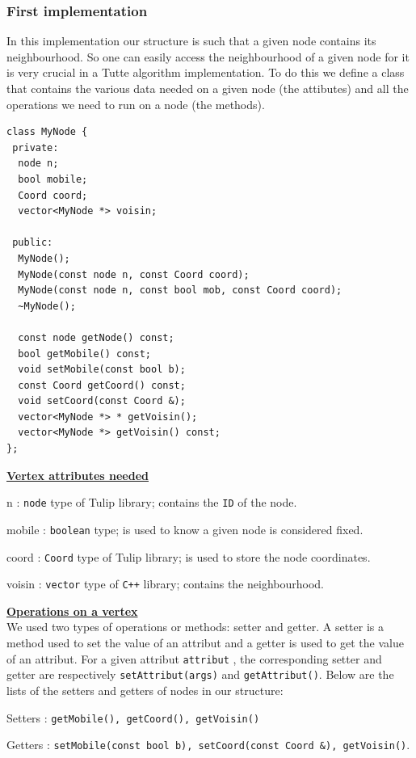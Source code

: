 \subsubsection{First implementation}
In this implementation our structure is such that a given node
contains its neighbourhood. So one can easily access the neighbourhood
of a given node for it is very crucial in a Tutte algorithm
implementation. To do this we define a class that contains the various
data needed on a given node (the attibutes) and all the operations we
need to run on a node (the methods).

\newpage
\begin{lstlisting}
class MyNode {
 private:
  node n;
  bool mobile;
  Coord coord;  
  vector<MyNode *> voisin;

 public:
  MyNode();
  MyNode(const node n, const Coord coord);
  MyNode(const node n, const bool mob, const Coord coord);
  ~MyNode();
  
  const node getNode() const;
  bool getMobile() const;
  void setMobile(const bool b);
  const Coord getCoord() const;
  void setCoord(const Coord &);
  vector<MyNode *> * getVoisin();
  vector<MyNode *> getVoisin() const;
};
\end{lstlisting}
\noindent
\underline{\bf Vertex attributes needed}
\begin{dinglist}{70}
\item[n]: \texttt{node} type of \textsf{Tulip} library; contains the \texttt{ID} of the node.  
\item[mobile]: \texttt{boolean} type; is used to know a given node is considered fixed.
\item[coord]: \texttt{Coord} type of \textsf{Tulip} library; is used to store the node coordinates. 
\item[voisin]: \texttt{vector} type of \texttt{C++} library; contains the neighbourhood.
\end{dinglist}
\noindent
\underline{\bf Operations on a vertex}~\\
We used two types of operations or methods: \textsf{setter} and
\textsf{getter}. A \textsf{setter} is a method used to set the value of an
attribut and a \textsf{getter} is used to get the value of an attribut. For
a given attribut \texttt{attribut} , the corresponding setter and getter
are respectively \verb+setAttribut(args)+ and \verb+getAttribut()+. Below
are the lists of the setters and getters of nodes in our structure:
\begin{dinglist}{70}
\item[Setters]: \verb+getMobile(), getCoord(), getVoisin()+  
\item[Getters]: \verb+setMobile(const bool b), setCoord(const Coord &), getVoisin()+.
\end{dinglist}

